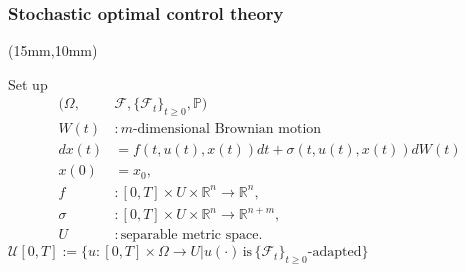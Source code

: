 \begin{frame}[plain]
    \frametitle{Stochastic optimal control theory}
    \begin{textblock*}{100mm}(15mm,10mm)
        \begin{graybox}{Set up}
            \begin{align*}
                (\Omega, & \mathcal{F}, \{\mathcal{F}_t\}_{t\geq 0}, \mathbb{P})
                \\
                W(t)&: m\text{-dimensional Brownian motion}
                \\
                dx(t)&=
                    f(t,u(t),x(t))dt+\sigma(t,u(t),x(t))dW(t)
                \\
                x(0)&=x_0,
                \\
                f &:
                    [0,T]\times U \times \mathbb{R}^n 
                    \to \mathbb{R}^n, 
                \\
                \sigma &: [0,T]\times U \times \mathbb{R}^n
                \to\mathbb{R}^{n+m},
                \\
                U &: \text{separable metric space}.
            \end{align*}
            \tcblower
            $
                \mathcal{U}[0,T]:=
                    \{
                        u:[0,T]\times\Omega 
                        \to U |
                         u(\cdot)\, 
                         \text{is}\, 
                         \{\mathcal{F}_t\}_{t\geq 0}\text{-adapted}
                    \}
            $
        \end{graybox}
    \end{textblock*}
\end{frame}
